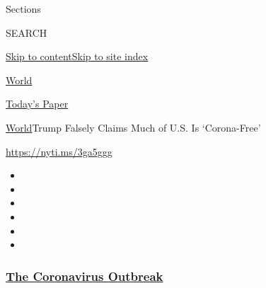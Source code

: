 Sections

SEARCH

\protect\hyperlink{site-content}{Skip to
content}\protect\hyperlink{site-index}{Skip to site index}

\href{https://www.nytimes3xbfgragh.onion/section/world}{World}

\href{https://myaccount.nytimes3xbfgragh.onion/auth/login?response_type=cookie\&client_id=vi}{}

\href{https://www.nytimes3xbfgragh.onion/section/todayspaper}{Today's
Paper}

\href{/section/world}{World}\textbar{}Trump Falsely Claims Much of U.S.
Is `Corona-Free'

\url{https://nyti.ms/3ga5ggg}

\begin{itemize}
\item
\item
\item
\item
\item
\item
\end{itemize}

\hypertarget{the-coronavirus-outbreak}{%
\subsubsection{\texorpdfstring{\href{https://www.nytimes3xbfgragh.onion/news-event/coronavirus?name=styln-coronavirus-national\&region=TOP_BANNER\&block=storyline_menu_recirc\&action=click\&pgtype=Article\&impression_id=60670650-f2ad-11ea-a4e6-eb9fa3a53629\&variant=undefined}{The
Coronavirus
Outbreak}}{The Coronavirus Outbreak}}\label{the-coronavirus-outbreak}}

